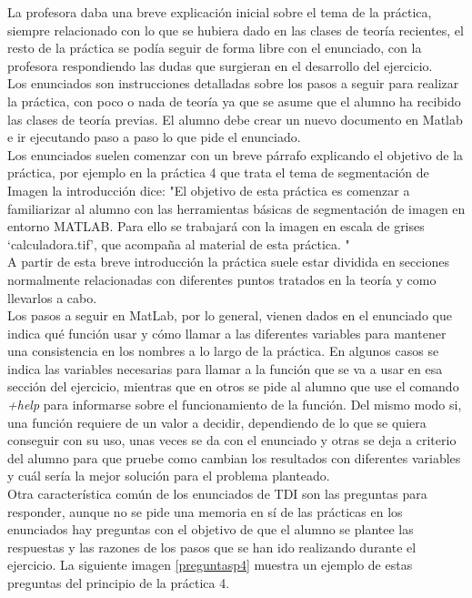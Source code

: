 \documentclass[a4paper,12pt]{report}
\begin{document}
La profesora daba una breve explicación inicial sobre el tema de la práctica, siempre relacionado con lo que se hubiera dado en las clases de teoría recientes, el resto de la práctica se podía seguir de forma libre con el enunciado, con la profesora respondiendo las dudas que surgieran en el desarrollo del ejercicio. \\

Los enunciados son instrucciones detalladas sobre los pasos a seguir para realizar la práctica, con poco o nada de teoría ya que se asume que el alumno ha recibido las clases de teoría previas. El alumno debe crear un nuevo documento en Matlab e ir ejecutando paso a paso lo que pide el enunciado. \\

Los enunciados suelen comenzar con un breve párrafo explicando el objetivo de la práctica, por ejemplo en la práctica 4 que trata el tema de segmentación de Imagen la introducción dice: "El objetivo de esta práctica es comenzar a familiarizar al alumno con las herramientas básicas de segmentación de imagen en entorno MATLAB. Para ello se trabajará con la imagen en escala de
grises ‘calculadora.tif’, que acompaña al material de esta práctica. "\\

A partir de esta breve introducción la práctica suele estar dividida en secciones normalmente relacionadas con diferentes puntos tratados en la teoría y como llevarlos a cabo.\\

Los pasos a seguir en MatLab, por lo general, vienen dados en el enunciado que indica qué función usar y cómo llamar a las diferentes variables para mantener una consistencia en los nombres a lo largo de la práctica. En algunos casos se indica las variables necesarias para llamar a la función que se va a usar en esa sección del ejercicio, mientras que en otros se pide al alumno que use el comando \textsl{+help} para informarse sobre el funcionamiento de la función. Del mismo modo si, una función requiere de un valor a decidir, dependiendo de lo que se quiera conseguir con su uso, unas veces se da con el enunciado y otras se deja a criterio del alumno para que pruebe como cambian los resultados con diferentes variables y cuál sería la mejor solución para el problema planteado.\\

Otra característica común de los enunciados de TDI son las preguntas para responder, aunque no se pide una memoria en sí de las prácticas en los enunciados hay preguntas con el objetivo de que el alumno se plantee las respuestas y las razones de los pasos que se han ido realizando durante el ejercicio.  La siguiente imagen \ref{preguntasp4} muestra un ejemplo de estas preguntas del principio de la práctica 4.
\end{document}
